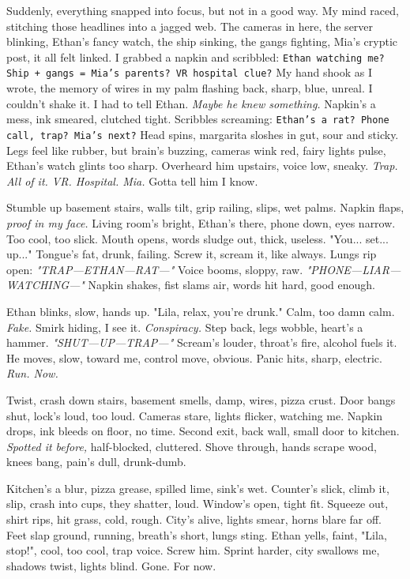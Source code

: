 \documentclass[12pt]{article}
\newcommand{\note}[1]{\texttt{#1}}
\begin{document}
{Suddenly, everything snapped into focus, but not in a good way. My mind raced, stitching those headlines into a jagged web. The cameras in here, the server blinking, \textnormal{Ethan}’s fancy watch, the ship sinking, the gangs fighting, \textnormal{Mia}’s cryptic post, it all felt linked. I grabbed a napkin and scribbled: \note{Ethan watching me? Ship + gangs = Mia’s parents? VR hospital clue?} My hand shook as I wrote, the memory of wires in my palm flashing back, sharp, blue, unreal. I couldn’t shake it. I had to tell \textnormal{Ethan}. \textit{Maybe he knew something.} Napkin’s a mess, ink smeared, clutched tight. Scribbles screaming: \note{Ethan’s a rat? Phone call, trap? Mia’s next?} Head spins, margarita sloshes in gut, sour and sticky. Legs feel like rubber, but brain’s buzzing, cameras wink red, fairy lights pulse, \textnormal{Ethan}’s watch glints too sharp. Overheard him upstairs, voice low, sneaky. \textit{Trap. All of it. VR. Hospital. Mia.} Gotta tell him I know.

Stumble up basement stairs, walls tilt, grip railing, slips, wet palms. Napkin flaps, \textit{proof in my face.} Living room’s bright, \textnormal{Ethan}’s there, phone down, eyes narrow. Too cool, too slick. Mouth opens, words sludge out, thick, useless. "You... set... up..." Tongue’s fat, drunk, failing. Screw it, scream it, like always. Lungs rip open: \textit{"TRAP—ETHAN—RAT—"} Voice booms, sloppy, raw. \textit{"PHONE—LIAR—WATCHING—"} Napkin shakes, fist slams air, words hit hard, good enough.

\textnormal{Ethan} blinks, slow, hands up. "Lila, relax, you’re drunk." Calm, too damn calm. \textit{Fake.} Smirk hiding, I see it. \textit{Conspiracy.} Step back, legs wobble, heart’s a hammer. \textit{"SHUT—UP—TRAP—"} Scream’s louder, throat’s fire, alcohol fuels it. He moves, slow, toward me, control move, obvious. Panic hits, sharp, electric. \textit{Run. Now.}

Twist, crash down stairs, basement smells, damp, wires, pizza crust. Door bangs shut, lock’s loud, too loud. Cameras stare, lights flicker, watching me. Napkin drops, ink bleeds on floor, no time. Second exit, back wall, small door to kitchen. \textit{Spotted it before,} half-blocked, cluttered. Shove through, hands scrape wood, knees bang, pain’s dull, drunk-dumb.

Kitchen’s a blur, pizza grease, spilled lime, sink’s wet. Counter’s slick, climb it, slip, crash into cups, they shatter, loud. Window’s open, tight fit. Squeeze out, shirt rips, hit grass, cold, rough. City’s alive, lights smear, horns blare far off. Feet slap ground, running, breath’s short, lungs sting. \textnormal{Ethan} yells, faint, "Lila, stop!", cool, too cool, trap voice. Screw him. Sprint harder, city swallows me, shadows twist, lights blind. Gone. For now.

}
\end{document}
